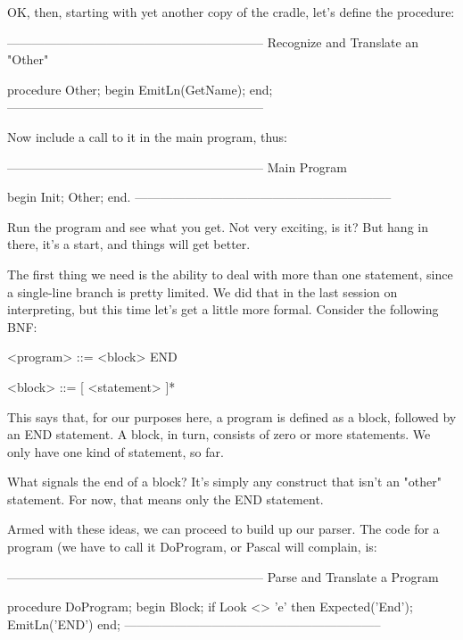 \documentclass[float=false, crop=false]{standalone}
\begin{document}
OK, then, starting with yet another copy of the cradle, let's define the
procedure:

\begin{code}
{--------------------------------------------------------------}
{ Recognize and Translate an "Other" }

procedure Other;
begin
   EmitLn(GetName);
end;
{--------------------------------------------------------------}
\end{code}

Now include a call to it in the main program, thus:

\begin{code}
{--------------------------------------------------------------}
{ Main Program }

begin
   Init;
   Other;
end.
{--------------------------------------------------------------}
\end{code}

Run the program and see what you get. Not very exciting, is it? But hang in
there, it's a start, and things will get better.

The first thing we need is the ability to deal with more than one statement,
since a single-line branch is pretty limited. We did that in the last session on
interpreting, but this time let's get a little more formal. Consider the
following BNF:

          <program> ::= <block> END

          <block> ::= [ <statement> ]*

This says that, for our purposes here, a program is defined as a block, followed
by an END statement. A block, in turn, consists of zero or more statements. We
only have one kind of statement, so far.

What signals the end of a block? It's simply any construct that isn't an "other"
statement. For now, that means only the END statement.

Armed with these ideas, we can proceed to build up our parser. The code for a
program (we have to call it DoProgram, or Pascal will complain, is:

\begin{code}
{--------------------------------------------------------------}
{ Parse and Translate a Program }

procedure DoProgram;
begin
   Block;
   if Look <> 'e' then Expected('End');
   EmitLn('END')
end;
{--------------------------------------------------------------}
\end{code}
\end{document}
